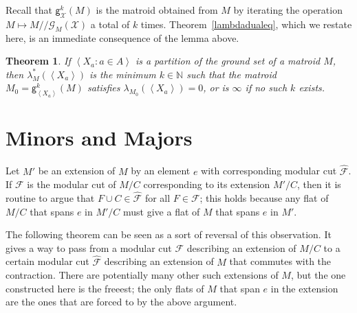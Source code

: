 \documentclass{amsart}
\theoremstyle{plain}
\newtheorem{theorem}{Theorem}[section]
\theoremstyle{definition}
\newcommand{\bN}{\mathbb N}
\newcommand{\cF}{\mathcal{F}}
\newcommand{\cX}{\mathcal{X}}
\newcommand{\dcon}{/ \!\! /}
\newcommand{\con}{/}
\newcommand{\wh}{\widehat}
\newcommand{\ab}[1]{\left\langle#1\right\rangle}
\newcommand{\gutsproj}[3]{\mathsf{g}_{#2}^{#3}(#1)}
\newcommand{\gutscut}[2]{{\mathcal{G}}_{#2}(#1)}
\begin{document}
Recall that $\gutsproj{M}{\cX}{k}$ is the matroid obtained from $M$ by iterating 
the operation $M \mapsto M \dcon \gutscut{\cX}{M}$ a total of $k$ times. 
Theorem~\ref{lambdadualeq}, which we restate here, is an immediate consequence 
of the lemma above. 

\begin{theorem}
  If $\ab{X_a : a \in A}$ is a partition of the ground set of a matroid $M$, 
  then $\lambda_M^*(\ab{X_a})$ is the minimum $k \in \bN$ 
  such that the matroid $M_0 = \gutsproj{M}{\ab{X_a}}{k}$ satisfies $\lambda_{M_0}(\ab{X_a}) = 0$, 
  or is $\infty$ if no such $k$ exists. 
\end{theorem}

\section{Minors and Majors}

Let $M'$ be an extension of $M$ by an element $e$ with corresponding modular cut $\wh{\cF}$. 
If $\cF$ is the modular cut of $M \con C$ corresponding to its extension $M' \con C$, 
then it is routine to argue that $F \cup C \in \wh{\cF}$ for all $F \in \cF$; 
this holds because any flat of $M \con C$ that spans $e$ in $M' \con C$ must give
a flat of $M$ that spans $e$ in $M'$. 

The following theorem can be seen as a sort of reversal of this observation.
It gives a way to pass from a modular cut $\cF$ describing an extension of $M \con C$ 
to a certain modular cut $\wh{\cF}$ describing an extension of $M$ that commutes with the contraction. 
There are potentially many other such extensions of $M$, but the one constructed here is the freeest; 
the only flats of $M$ that span $e$ in the extension are the ones that are forced to by the above argument. 
\end{document}
